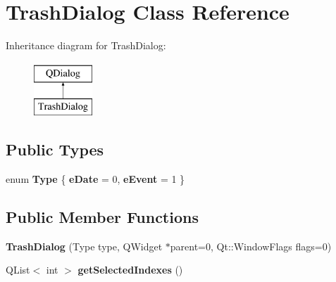 \hypertarget{class_trash_dialog}{\section{Trash\-Dialog Class Reference}
\label{class_trash_dialog}
}
Inheritance diagram for Trash\-Dialog\-:\begin{figure}[H]
\begin{center}
\leavevmode
\includegraphics[height=2.000000cm]{class_trash_dialog}
\end{center}
\end{figure}
\subsection*{Public Types}
\begin{DoxyCompactItemize}
\item 
enum {\bfseries Type} \{ {\bfseries e\-Date} = 0, 
{\bfseries e\-Event} = 1
 \}
\end{DoxyCompactItemize}
\subsection*{Public Member Functions}
\begin{DoxyCompactItemize}
\item 
\hypertarget{class_trash_dialog_a00e7d3754144ae64887a178f0b241e20}{{\bfseries Trash\-Dialog} (Type type, Q\-Widget $\ast$parent=0, Qt\-::\-Window\-Flags flags=0)}\label{class_trash_dialog_a00e7d3754144ae64887a178f0b241e20}

\item 
\hypertarget{class_trash_dialog_afd0247ce507739cec9dff6d73f7c3c62}{Q\-List$<$ int $>$ {\bfseries get\-Selected\-Indexes} ()}\label{class_trash_dialog_afd0247ce507739cec9dff6d73f7c3c62}

\end{DoxyCompactItemize}
